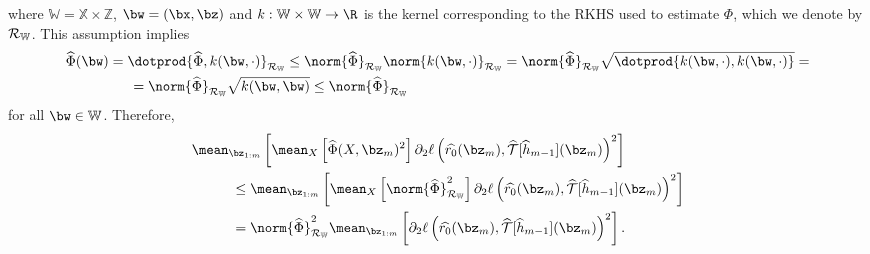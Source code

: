 where $ \mathbb{W} = \mathbb{X} \times \mathbb{Z} $, $ \bw = ( \bx, \bz ) $ and $ k : \mathbb{W} \times \mathbb{W} \to \R $ is the kernel corresponding to the RKHS used to estimate $ \Phi $, which we denote by $ \mathcal{R}_{ \mathbb{W} } $.
This assumption implies
\begin{align*}
    &\hat{ \Phi } ( \bw )
    = \dotprod{ \hat{ \Phi }, k ( \bw, \cdot ) }_{ \rkhsw }
    \leq \norm{ \hat{ \Phi } }_{ \rkhsw } \norm{ k ( \bw, \cdot ) }_{ \rkhsw }
    = \norm{ \hat{ \Phi } }_{ \rkhsw } \sqrt{ \dotprod{ k ( \bw, \cdot ), k ( \bw, \cdot ) } } = \\
    &\hspace{1.6cm}
    = \norm{ \hat{ \Phi } }_{ \rkhsw } \sqrt{ k ( \bw, \bw ) }
    \leq \norm{ \hat{ \Phi } }_{ \rkhsw }
\end{align*}
for all $ \bw \in \mathbb{W} $.
Therefore,
\begin{align*}
    &\mean_{ \bz_{ 1:m } } \left[
        \mean_{ X } \left[
            \hat{ \Phi } ( X, \bz_{ m } )^2
        \right]
        \partial_{ 2 } \ell \left(
            \hat{ r_{ 0 } } ( \bz_{ m } ),
            \hat{ \mathcal{T} } [ \hat{ h }_{ m-1 } ] ( \bz_{ m } )
        \right)^2
    \right] \\
    &\hspace{1cm}\leq
    \mean_{ \bz_{ 1:m } } \left[
        \mean_{ X } \left[
            \norm{ \hat{ \Phi } }_{ \rkhsw }^2
        \right]
        \partial_{ 2 } \ell \left(
            \hat{ r_{ 0 } } ( \bz_{ m } ),
            \hat{ \mathcal{T} } [ \hat{ h }_{ m-1 } ] ( \bz_{ m } )
        \right)^2
    \right] \\
    &\hspace{1cm}=
    \norm{ \hat{ \Phi } }_{ \rkhsw }^2
    \mean_{ \bz_{ 1:m } } \left[
        \partial_{ 2 } \ell \left(
            \hat{ r_{ 0 } } ( \bz_{ m } ),
            \hat{ \mathcal{T} } [ \hat{ h }_{ m-1 } ] ( \bz_{ m } )
        \right)^2
    \right]
.\end{align*}

